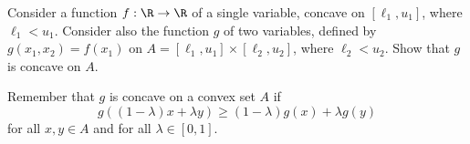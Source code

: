 
Consider a function $f:\R\to \R$ of a single variable, concave on
$[\ell_1, u_1]$, where $\ell_1 < u_1$. Consider also the function $g$ of two variables, defined by
$g(x_1,x_2) = f(x_1)$ on $A=[\ell_1,u_1] \times [\ell_2,u_2]$, where
$\ell_2 < u_2$. Show
that $g$ is concave on $A$.

Remember that $g$ is concave on a convex set $A$ if $$g((1-\lambda)x+\lambda y) \geq (1-\lambda)g(x)+\lambda g(y)$$
for all $x,y \in A$ and for all $\lambda \in [0,1]$.

